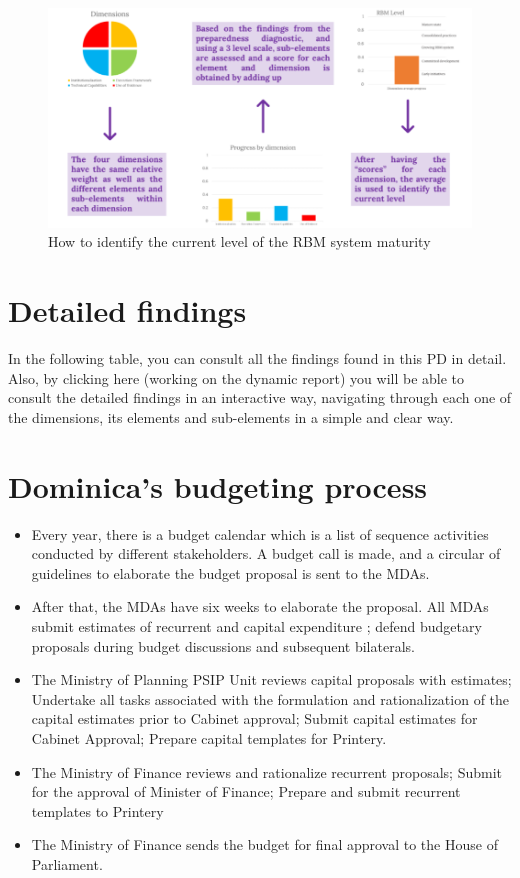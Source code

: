 \documentclass[
]{book}
\begin{document}
\begin{figure}
\includegraphics[width=1\linewidth]{./images/figure_8} \caption{How to identify the current level of the RBM system maturity}\label{fig:figure8}
\end{figure}

\hypertarget{appendixB}{%
\chapter{Detailed findings}\label{appendixB}}

In the following table, you can consult all the findings found in this PD in detail. Also, by clicking here (working on the dynamic report) you will be able to consult the detailed findings in an interactive way, navigating through each one of the dimensions, its elements and sub-elements in a simple and clear way.

\hypertarget{appendixC}{%
\chapter{Dominica's budgeting process}\label{appendixC}}

\begin{itemize}
\item
  Every year, there is a budget calendar which is a list of sequence activities conducted by different stakeholders. A budget call is made, and a circular of guidelines to elaborate the budget proposal is sent to the MDAs.
\item
  After that, the MDAs have six weeks to elaborate the proposal. All MDAs submit estimates of recurrent and capital expenditure ; defend budgetary proposals during budget discussions and subsequent bilaterals.
\item
  The Ministry of Planning PSIP Unit reviews capital proposals with estimates; Undertake all tasks associated with the formulation and rationalization of the capital estimates prior to Cabinet approval; Submit capital estimates for Cabinet Approval; Prepare capital templates for Printery.
\item
  The Ministry of Finance reviews and rationalize recurrent proposals; Submit for the approval of Minister of Finance; Prepare and submit recurrent templates to Printery
\item
  The Ministry of Finance sends the budget for final approval to the House of Parliament.
\end{itemize}
\end{document}
